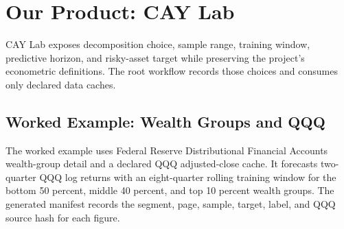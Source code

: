 \section{Our Product: CAY Lab}
\label{sec:our_product}

CAY Lab exposes decomposition choice, sample range, training window,
predictive horizon, and risky-asset target while preserving the project's
econometric definitions. The root workflow records those choices and consumes
only declared data caches.

\subsection{Worked Example: Wealth Groups and QQQ}

The worked example uses Federal Reserve Distributional Financial Accounts
wealth-group detail and a declared QQQ adjusted-close cache. It forecasts
two-quarter QQQ log returns with an eight-quarter rolling training window for
the bottom 50 percent, middle 40 percent, and top 10 percent wealth groups.
The generated manifest records the segment, page, sample, target, label, and
QQQ source hash for each figure.


